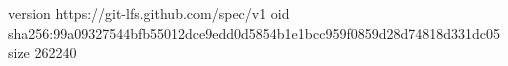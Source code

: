 version https://git-lfs.github.com/spec/v1
oid sha256:99a09327544bfb55012dce9edd0d5854b1e1bcc959f0859d28d74818d331dc05
size 262240
